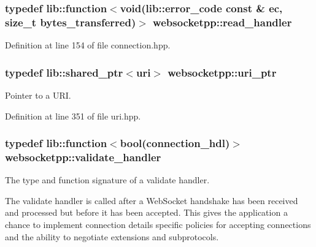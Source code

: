 \hypertarget{namespacewebsocketpp_a6fb3f66d640c365795dcc01a7f87c900}{}
\subsubsection[{read\+\_\+handler}]{\setlength{\rightskip}{0pt plus 5cm}typedef lib\+::function$<$void(lib\+::error\+\_\+code const \& ec, size\+\_\+t bytes\+\_\+transferred)$>$ {\bf websocketpp\+::read\+\_\+handler}}\label{namespacewebsocketpp_a6fb3f66d640c365795dcc01a7f87c900}


Definition at line 154 of file connection.\+hpp.

\hypertarget{namespacewebsocketpp_aae370ea5ac83a8ece7712cb39fc23f5b}{}
\subsubsection[{uri\+\_\+ptr}]{\setlength{\rightskip}{0pt plus 5cm}typedef lib\+::shared\+\_\+ptr$<${\bf uri}$>$ {\bf websocketpp\+::uri\+\_\+ptr}}\label{namespacewebsocketpp_aae370ea5ac83a8ece7712cb39fc23f5b}


Pointer to a U\+R\+I. 



Definition at line 351 of file uri.\+hpp.

\hypertarget{namespacewebsocketpp_ae28f3fed86a59b1998746694f3d4edbd}{}
\subsubsection[{validate\+\_\+handler}]{\setlength{\rightskip}{0pt plus 5cm}typedef lib\+::function$<$bool({\bf connection\+\_\+hdl})$>$ {\bf websocketpp\+::validate\+\_\+handler}}\label{namespacewebsocketpp_ae28f3fed86a59b1998746694f3d4edbd}


The type and function signature of a validate handler. 

The validate handler is called after a Web\+Socket handshake has been received and processed but before it has been accepted. This gives the application a chance to implement connection details specific policies for accepting connections and the ability to negotiate extensions and subprotocols.

